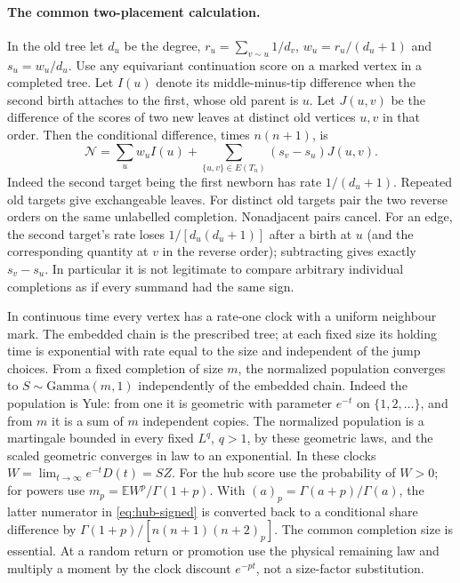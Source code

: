 \documentclass[11pt]{article}
\theoremstyle{remark}
\numberwithin{equation}{section}
\newcommand{\E}{\mathbb E}
\begin{document}
\paragraph{The common two-placement calculation.}
In the old tree let $d_u$ be the degree, $r_u=\sum_{v\sim u}1/d_v$, $w_u=r_u/(d_u+1)$ and $s_u=w_u/d_u$. Use any equivariant continuation score on a marked vertex in a completed tree. Let $I(u)$ denote its middle-minus-tip difference when the second birth attaches to the first, whose old parent is $u$. Let $J(u,v)$ be the difference of the scores of two new leaves at distinct old vertices $u,v$ in that order. Then the conditional difference, times $n(n+1)$, is
\begin{equation}\label{eq:hub-signed}
 \mathcal N=\sum_u w_u I(u)+\sum_{\{u,v\}\in E(T_n)}(s_v-s_u)J(u,v).
\end{equation}
Indeed the second target being the first newborn has rate $1/(d_u+1)$. Repeated old targets give exchangeable leaves. For distinct old targets pair the two reverse orders on the same unlabelled completion. Nonadjacent pairs cancel. For an edge, the second target's rate loses $1/[d_u(d_u+1)]$ after a birth at $u$ (and the corresponding quantity at $v$ in the reverse order); subtracting gives exactly $s_v-s_u$. In particular it is not legitimate to compare arbitrary individual completions as if every summand had the same sign.

In continuous time every vertex has a rate-one clock with a uniform neighbour mark. The embedded chain is the prescribed tree; at each fixed size its holding time is exponential with rate equal to the size and independent of the jump choices. From a fixed completion of size $m$, the normalized population converges to $S\sim\mathrm{Gamma}(m,1)$ independently of the embedded chain. Indeed the population is Yule: from one it is geometric with parameter $e^{-t}$ on $\{1,2,\ldots\}$, and from $m$ it is a sum of $m$ independent copies. The normalized population is a martingale bounded in every fixed $L^q$, $q>1$, by these geometric laws, and the scaled geometric converges in law to an exponential. In these clocks $W=\lim_{t\to\infty} e^{-t}D(t)=SZ$. For the hub score use the probability of $W>0$; for powers use $m_p=\E W^p/\Gamma(1+p)$. With $(a)_p=\Gamma(a+p)/\Gamma(a)$, the latter numerator in \eqref{eq:hub-signed} is converted back to a conditional share difference by $\Gamma(1+p)/[n(n+1)(n+2)_p]$. The common completion size is essential. At a random return or promotion use the physical remaining law and multiply a moment by the clock discount $e^{-p t}$, not a size-factor substitution.
\end{document}
